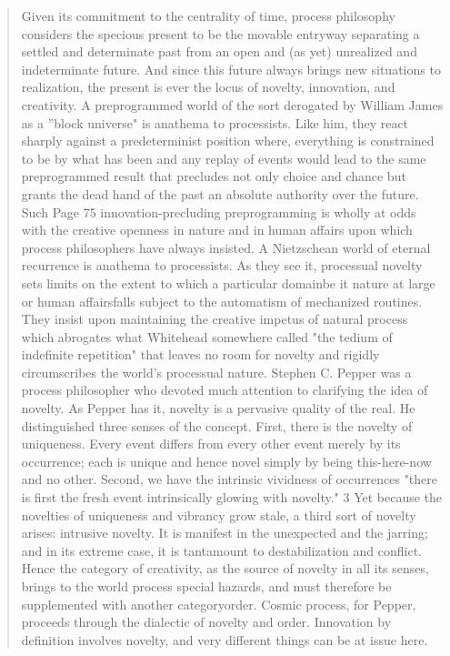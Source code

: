 \documentclass[a4paper]{Thesis}
\begin{document}
\begin{quotation}
{		Given its commitment to the centrality of time, process philosophy considers the specious
		present to be the movable entryway separating a settled and determinate past from an
		open and (as yet) unrealized and indeterminate future. And since this future always
		brings new situations to realization, the present is ever the locus of novelty, innovation,
		and creativity.
		A preprogrammed world of the sort derogated by William James as a ''block universe" is
		anathema to processists. Like him, they react sharply against a predeterminist position
		where, everything is constrained to be by what has been and any replay of events would
		lead to the same preprogrammed result that precludes not only choice and chance but
		grants the dead hand of the past an absolute authority over the future. Such
		Page 75
		innovation-precluding preprogramming is wholly at odds with the creative openness in
		nature and in human affairs upon which process philosophers have always insisted. A
		Nietzschean world of eternal recurrence is anathema to processists. As they see it,
		processual novelty sets limits on the extent to which a particular domainbe it nature at
		large or human affairsfalls subject to the automatism of mechanized routines. They insist
		upon maintaining the creative impetus of natural process which abrogates what
		Whitehead somewhere called "the tedium of indefinite repetition" that leaves no room for
		novelty and rigidly circumscribes the world's processual nature.
		Stephen C. Pepper was a process philosopher who devoted much attention to clarifying
		the idea of novelty. As Pepper has it, novelty is a pervasive quality of the real. He
		distinguished three senses of the concept. First, there is the novelty of uniqueness. Every
		event differs from every other event merely by its occurrence; each is unique and hence
		novel simply by being this-here-now and no other. Second, we have the intrinsic vividness
		of occurrences "there is first the fresh event intrinsically glowing with novelty." 3 Yet
		because the novelties of uniqueness and vibrancy grow stale, a third sort of novelty
		arises: intrusive novelty. It is manifest in the unexpected and the jarring; and in its
		extreme case, it is tantamount to destabilization and conflict. Hence the category of
		creativity, as the source of novelty in all its senses, brings to the world process special
		hazards, and must therefore be supplemented with another categoryorder. Cosmic
		process, for Pepper, proceeds through the dialectic of novelty and order.
		Innovation by definition involves novelty, and very different things can be at issue here.
}
\end{quotation}
\end{document}
